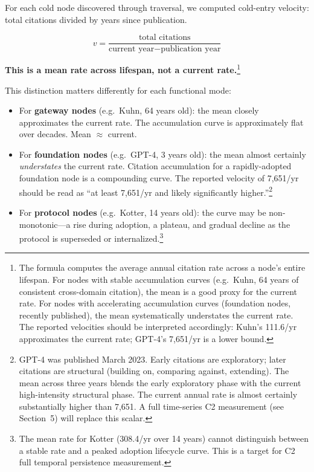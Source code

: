 \documentclass[11pt]{article}
\begin{document}
For each cold node discovered through traversal, we computed cold-entry velocity: total citations divided by years since publication.

$$v = \frac{\text{total citations}}{\text{current year} - \text{publication year}}$$

\textbf{This is a mean rate across lifespan, not a current rate.}\footnote{\label{fn:mean}The formula computes the average annual citation rate across a node's entire lifespan. For nodes with stable accumulation curves (e.g.\ Kuhn, 64 years of consistent cross-domain citation), the mean is a good proxy for the current rate. For nodes with accelerating accumulation curves (foundation nodes, recently published), the mean systematically understates the current rate. The reported velocities should be interpreted accordingly: Kuhn's 111.6/yr approximates the current rate; GPT-4's 7,651/yr is a lower bound.}

This distinction matters differently for each functional mode:

\begin{itemize}
\item For \textbf{gateway nodes} (e.g.\ Kuhn, 64 years old): the mean closely approximates the current rate. The accumulation curve is approximately flat over decades. Mean $\approx$ current.

\item For \textbf{foundation nodes} (e.g.\ GPT-4, 3 years old): the mean almost certainly \textit{understates} the current rate. Citation accumulation for a rapidly-adopted foundation node is a compounding curve. The reported velocity of 7,651/yr should be read as ``at least 7,651/yr and likely significantly higher.''\footnote{\label{fn:gpt4}GPT-4 was published March 2023. Early citations are exploratory; later citations are structural (building on, comparing against, extending). The mean across three years blends the early exploratory phase with the current high-intensity structural phase. The current annual rate is almost certainly substantially higher than 7,651. A full time-series C2 measurement (see Section~5) will replace this scalar.}

\item For \textbf{protocol nodes} (e.g.\ Kotter, 14 years old): the curve may be non-monotonic---a rise during adoption, a plateau, and gradual decline as the protocol is superseded or internalized.\footnote{\label{fn:kotter}The mean rate for Kotter (308.4/yr over 14 years) cannot distinguish between a stable rate and a peaked adoption lifecycle curve. This is a target for C2 full temporal persistence measurement.}
\end{itemize}
\end{document}
